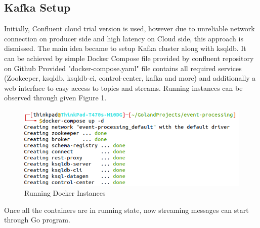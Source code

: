 \documentclass[sigplan,screen]{acmart}
\begin{document}
\subsection{Kafka Setup}
Initially, Confluent cloud\cite{confluent-cloud} trial version is used, however due to unreliable network connection on producer side and high latency on Cloud side, this approach is dismissed. 
The main idea became to setup Kafka cluster along with ksqldb. It can be achieved by simple Docker Compose file provided by confluent repository on Github\cite{cp-all-in-one}
Provided "docker-compose.yaml" file contains all required services (Zookeeper, ksqldb, ksqldb-ci, control-center, kafka and more) and additionally a web interface to easy access to topics and streams. Running instances can be observed through given Figure 1. 
\begin{figure}[H]
    \centerline{\includegraphics[scale=.4]{assets/running-docker-instances.png}}
    \caption{Running Docker Instances}
    \label{fig}
\end{figure}
Once all the containers are in running state, now streaming messages can start through Go program. 
\end{document}
